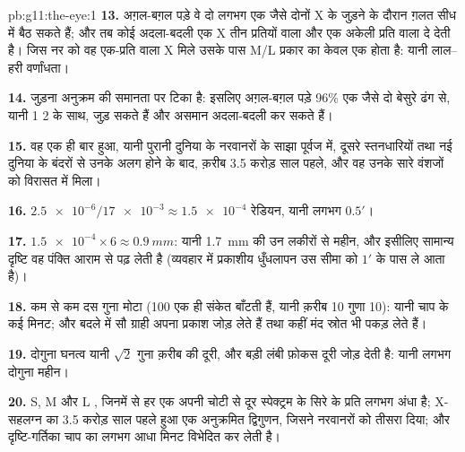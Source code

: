 \begin{solution}{pb:g11:the-eye:1}
\textbf{13.} अग़ल-बग़ल पड़े वे दो लगभग एक जैसे  दोनों X  के
जुड़ने के दौरान ग़लत सीध में बैठ सकते हैं; और तब कोई अदला-बदली एक X तीन
प्रतियों वाला और एक अकेली प्रति वाला दे देती है। जिस नर को वह एक-प्रति वाला
X मिले उसके पास M/L प्रकार का केवल एक  होता है: यानी लाल--हरी
वर्णांधता।

\textbf{14.} जुड़ना अनुक्रम की समानता पर टिका है: इसलिए अग़ल-बग़ल पड़े 96\%
एक जैसे दो  बेसुरे ढंग से, यानी  1  2 के साथ, जुड़ सकते हैं और
असमान अदला-बदली कर सकते हैं।

\textbf{15.} वह एक ही बार हुआ, यानी पुरानी दुनिया के नरवानरों के साझा
पूर्वज में, दूसरे स्तनधारियों तथा नई दुनिया के बंदरों से उनके अलग होने के
बाद, क़रीब 3.5 करोड़ साल पहले, और वह उनके सारे वंशजों को विरासत में मिला।

\textbf{16.} $\num{2.5e-6}/\num{17e-3} \approx \num{1.5e-4}$ रेडियन,
यानी लगभग $0.5'$।

\textbf{17.} $\num{1.5e-4} \times 6 \approx \qty{0.9}{mm}$: यानी
\qty{1.7}{mm} की उन लकीरों से महीन, और इसीलिए सामान्य दृष्टि वह पंक्ति
आराम से पढ़ लेती है (व्यवहार में प्रकाशीय धुँधलापन उस सीमा को
$1'$ के पास ले आता है)।

\textbf{18.} कम से कम दस गुना मोटा (100  एक ही संकेत बाँटती हैं,
यानी क़रीब 10 गुणा 10): यानी चाप के कई मिनट; और बदले में सौ ग्राही अपना
प्रकाश जोड़ लेते हैं तथा कहीं मंद स्रोत भी पकड़ लेते हैं।

\textbf{19.} दोगुना घनत्व यानी $\sqrt{2}$ गुना क़रीब की दूरी, और बड़ी 
लंबी फ़ोकस दूरी जोड़ देती है: यानी लगभग दोगुना महीन।

\textbf{20.} S, M और L , जिनमें से हर एक अपनी चोटी से दूर स्पेक्ट्रम
के सिरे के प्रति लगभग अंधा है; X-सहलग्न   का 3.5 करोड़ साल पहले
हुआ एक अनुक्रमित द्विगुणन, जिसने नरवानरों को तीसरा दिया; और
दृष्टि-गर्तिका चाप का लगभग आधा मिनट विभेदित कर लेती है।
\end{solution}
